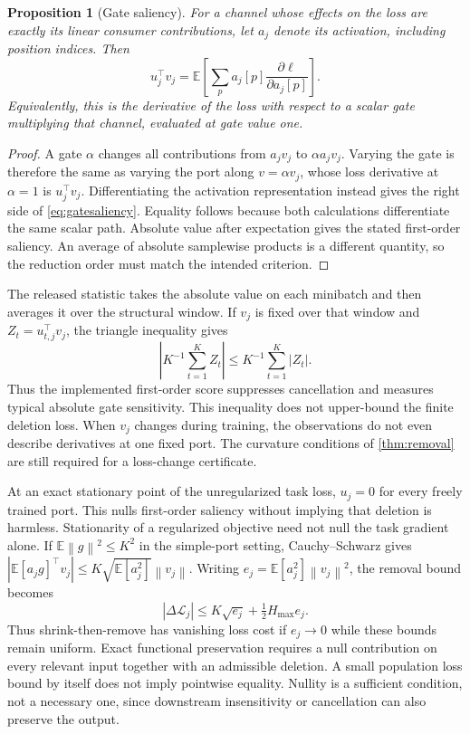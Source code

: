 \documentclass[10pt]{article}
\theoremstyle{paper}
\newtheorem{proposition}[theorem]{Proposition}
\newcommand{\E}{\mathbb E}
\newcommand{\Lcal}{\mathcal L}
\newcommand{\norm}[1]{\left\lVert #1\right\rVert}
\begin{document}
\begin{proposition}[Gate saliency]
\label{prop:gate}
For a channel whose effects on the loss are exactly its linear consumer contributions, let $a_j$ denote its activation, including position indices. Then
\begin{equation}
u_j^\top v_j=\E\left[\sum_p a_j[p]\frac{\partial\ell}{\partial a_j[p]}\right].
\label{eq:gatesaliency}
\end{equation}
Equivalently, this is the derivative of the loss with respect to a scalar gate multiplying that channel, evaluated at gate value one.
\end{proposition}
\begin{proof}
A gate $\alpha$ changes all contributions from $a_jv_j$ to $\alpha a_jv_j$. Varying the gate is therefore the same as varying the port along $v=\alpha v_j$, whose loss derivative at $\alpha=1$ is $u_j^\top v_j$. Differentiating the activation representation instead gives the right side of \cref{eq:gatesaliency}. Equality follows because both calculations differentiate the same scalar path. Absolute value after expectation gives the stated first-order saliency. An average of absolute samplewise products is a different quantity, so the reduction order must match the intended criterion.
\end{proof}

The released statistic takes the absolute value on each minibatch and then averages it over the structural window. If $v_j$ is fixed over that window and $Z_t=u_{t,j}^\top v_j$, the triangle inequality gives
\[
\left|K^{-1}\sum_{t=1}^K Z_t\right|
\le K^{-1}\sum_{t=1}^K|Z_t|.
\]
Thus the implemented first-order score suppresses cancellation and measures typical absolute gate sensitivity. This inequality does not upper-bound the finite deletion loss. When $v_j$ changes during training, the observations do not even describe derivatives at one fixed port. The curvature conditions of \cref{thm:removal} are still required for a loss-change certificate.

At an exact stationary point of the unregularized task loss, $u_j=0$ for every freely trained port. This nulls first-order saliency without implying that deletion is harmless. Stationarity of a regularized objective need not null the task gradient alone. If $\E\norm g^2\le K^2$ in the simple-port setting, Cauchy--Schwarz gives $|\E[a_jg]^\top v_j|\le K\sqrt{\E[a_j^2]}\norm{v_j}$. Writing $e_j=\E[a_j^2]\norm{v_j}^2$, the removal bound becomes
\begin{equation}
|\Delta\Lcal_j|\le K\sqrt{e_j}+\tfrac12H_{\max}e_j.
\label{eq:shrink}
\end{equation}
Thus shrink-then-remove has vanishing loss cost if $e_j\to0$ while these bounds remain uniform. Exact functional preservation requires a null contribution on every relevant input together with an admissible deletion. A small population loss bound by itself does not imply pointwise equality. Nullity is a sufficient condition, not a necessary one, since downstream insensitivity or cancellation can also preserve the output.
\end{document}
